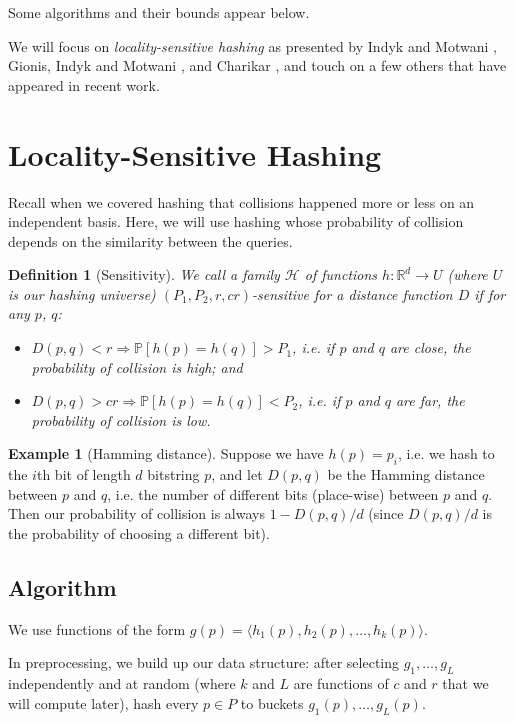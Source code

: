 \documentclass[11pt]{article}
\newtheorem{definition}[theorem]{Definition}
\theoremstyle{definition}
\newtheorem*{example}{Example}
\begin{document}
Some algorithms and their bounds appear below.

We will focus on \emph{locality-sensitive hashing} as presented by Indyk and Motwani \cite{im98}, Gionis, Indyk and Motwani \cite{gim99}, and Charikar \cite{cha02}, and touch on a few others that have appeared in recent work.

\section{Locality-Sensitive Hashing}

Recall when we covered hashing that collisions happened more or less on an independent basis. Here, we will use hashing whose probability of collision depends on the similarity between the queries.

\begin{definition}[Sensitivity]
    We call a family $\mathcal{H}$ of functions $h : \mathbb{R}^d \rightarrow U$ (where $U$ is our hashing universe) \emph{$(P_1, P_2, r, cr)$-sensitive} for a distance function $D$ if for any $p$, $q$:
        \begin{itemize}
            \item $D(p,q) < r \Rightarrow \mathbb{P}[h(p) = h(q)] > P_1$, i.e. if $p$ and $q$ are close, the probability of collision is high; and
            \item $D(p,q) > cr \Rightarrow \mathbb{P}[h(p) = h(q)] < P_2$, i.e. if $p$ and $q$ are far, the probability of collision is low.
        \end{itemize}
\end{definition}

\begin{example}[Hamming distance]
    Suppose we have $h(p) = p_i$, i.e. we hash to the $i$th bit of length $d$ bitstring $p$, and let $D(p,q)$ be the Hamming distance between $p$ and $q$, i.e. the number of different bits (place-wise) between $p$ and $q$. Then our probability of collision is always $1 - D(p,q)/d$ (since $D(p,q)/d$ is the probability of choosing a different bit).
\end{example}

\subsection{Algorithm}

We use functions of the form $g(p) = \langle h_1(p), h_2(p), \ldots, h_k(p) \rangle$.

In preprocessing, we build up our data structure: after selecting $g_1, \ldots, g_L$ independently and at random (where $k$ and $L$ are functions of $c$ and $r$ that we will compute later), hash every $p \in P$ to buckets $g_1(p), \ldots, g_L(p)$.
\end{document}
